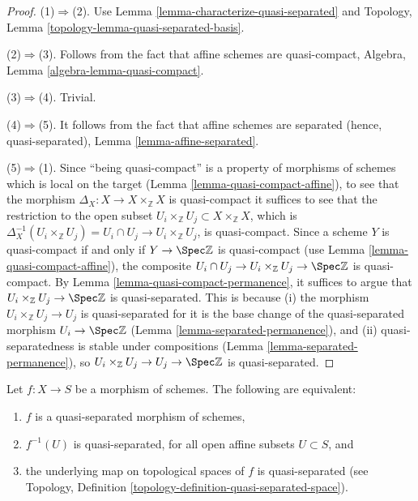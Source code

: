 \begin{proof}
	(1)$\Rightarrow$(2).
	Use Lemma \ref{lemma-characterize-quasi-separated} and
	Topology, Lemma \ref{topology-lemma-quasi-separated-basis}.
	
	\medskip\noindent
	(2)$\Rightarrow$(3).
	Follows from the fact that affine schemes are quasi-compact,
	Algebra, Lemma \ref{algebra-lemma-quasi-compact}.
	
	\medskip\noindent
	(3)$\Rightarrow$(4). Trivial.
	
	\medskip\noindent
	(4)$\Rightarrow$(5).
	It follows from the fact that affine schemes are separated
	(hence, quasi-separated),
	Lemma \ref{lemma-affine-separated}.
	
	\medskip\noindent
	(5)$\Rightarrow$(1).
	Since “being quasi-compact” is a property of morphisms of schemes which is local on the target (Lemma \ref{lemma-quasi-compact-affine}), to see that the morphism $\Delta_X:X\to X\times_\mathbb{Z}X$ is quasi-compact it suffices to see that the restriction to the open subset $U_i \times_\mathbb{Z}U_j \subset X\times_\mathbb{Z}X$, which is $\Delta_X^{-1}(U_i \times_\mathbb{Z}U_j )=U_i \cap U_j \to U_i \times_\mathbb{Z}U_j $, is quasi-compact. Since a scheme $Y$ is quasi-compact if and only if $Y\to\Spec \mathbb{Z}$ is quasi-compact (use Lemma \ref{lemma-quasi-compact-affine}), the composite $U_i \cap U_j \to U_i \times_\mathbb{Z}U_j \to\Spec \mathbb{Z}$ is quasi-compact. By Lemma \ref{lemma-quasi-compact-permanence}, it suffices to argue that $U_i \times_\mathbb{Z}U_j \to\Spec \mathbb{Z}$ is quasi-separated. This is because (i) the morphism $U_i \times_\mathbb{Z} U_j \to U_j $ is quasi-separated for it is the base change of the quasi-separated morphism $U_i \to\Spec \mathbb{Z}$ (Lemma \ref{lemma-separated-permanence}), and (ii) quasi-separatedness is stable under compositions (Lemma \ref{lemma-separated-permanence}), so $U_i \times_\mathbb{Z}U_j \to U_j \to\Spec \mathbb{Z}$ is quasi-separated.
\end{proof}

\begin{lemma}
\label{lemma-quasi-separatedness-is-topological}
Let $f:X\to S$ be a morphism of schemes. The following are equivalent:
\begin{enumerate}
	\item $f$ is a quasi-separated morphism of schemes,
	\item $f^{-1}(U)$ is quasi-separated, for all open
	affine subsets $U\subset S$, and
	\item the underlying map on topological spaces of $f$ is quasi-separated
	(see Topology, Definition \ref{topology-definition-quasi-separated-space}).
\end{enumerate}
\end{lemma}

